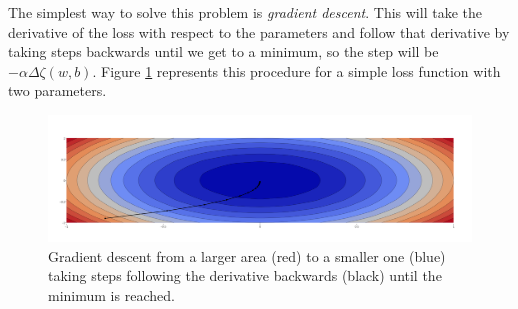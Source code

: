 \documentclass[english, 11pt]{article}
\begin{document}
	The simplest way to solve this problem is \emph{gradient descent}. This will take the derivative of the loss with respect to the parameters and follow that derivative by taking steps backwards until we get to a minimum, so the step will be $-\alpha\Delta\zeta(w, b)$. Figure \ref{fig:gradient-descent} represents this procedure for a simple loss function with two parameters.

	\begin{figure}[!hbt]
		\centering
		\includegraphics[width=\textwidth]{l1/figures/contour-scatter}
		\caption{Gradient descent from a larger area (red) to a smaller one (blue) taking steps following the derivative backwards (black) until the minimum is reached.}
		\label{fig:gradient-descent}
	\end{figure}
  
\end{document}

